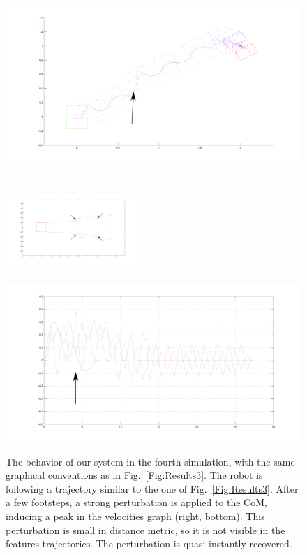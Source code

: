 \begin{figure}[h]
\begin{minipage}{0.5\textwidth}
 \centering
 \includegraphics[scale=.25]{Chap4-Visual-Servoing/steps4_hrp2_1.pdf}
\end{minipage}
\begin{minipage}{0.5\textwidth}
 \centering
 \includegraphics[width=5cm,height=4cm]{Chap4-Visual-Servoing/features4_hrp2_1.pdf}
\\
 \includegraphics[scale=.2]{Chap4-Visual-Servoing/vels4_hrp2_1.pdf}
\end{minipage}
 \caption[]{\label{Fig:Results4}\small{The behavior of our system in the fourth simulation, with the same graphical conventions as in Fig.~\ref{Fig:Results3}. The robot is following a trajectory similar to the one of Fig.~\ref{Fig:Results3}. After a few footsteps, a strong perturbation is applied to the CoM, inducing a peak in the velocities graph (right, bottom). This perturbation is small in distance metric, so it is not visible in the features trajectories. The perturbation is quasi-instantly recovered.}}
 \end{figure}

